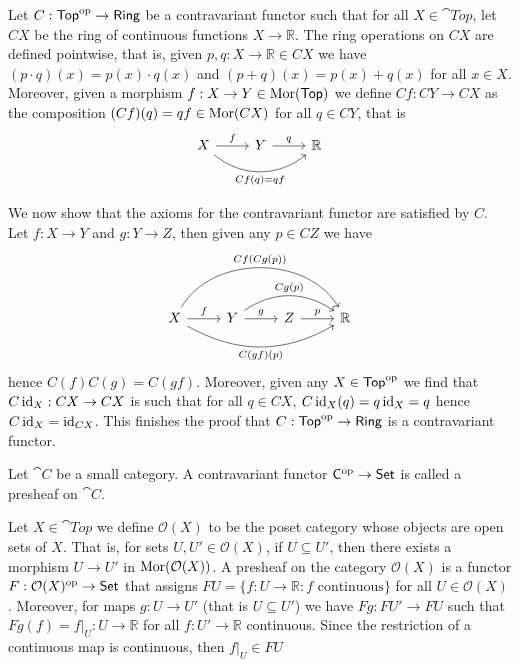 \begin{example}
  Let \(C: \mathsf{Top}^{\mathrm{op}} \to \mathsf{Ring}\) be a contravariant functor such that
  for all \(X \in \cat{Top}\), let \(C X\) be the ring of continuous functions
  \(X \to \mathbb{R}\). The ring operations on \(C X\) are defined pointwise,
  that is, given \(p, q: X \to \mathbb{R} \in C X\) we have \((p \cdot q) (x) =
  p(x) \cdot q(x)\) and \((p + q)(x) = p(x) + q(x)\) for all \(x \in X\).
  Moreover, given a morphism \(f: X \to Y \in \operatorname{Mor}(\mathsf{Top})\) we define \(C f:
  C Y \to C X\) as the composition \((C f)(q) = q f \in \operatorname{Mor}(C X)\) for all \(q
  \in C Y\), that is
  \[
    \begin{tikzcd}
      X \ar[r, "f"] \ar[rr, bend right = 40, swap, "C f(q) = q f"]
      & Y \ar[r, "q"] & \mathbb{R}
    \end{tikzcd}
  \] 

  We now show that the axioms for the contravariant functor are satisfied by
  \(C\). Let \(f: X \to Y\) and \(g: Y \to Z\), then given any \(p \in C Z\) we
  have 
  \[
    \begin{tikzcd}
      X \ar[r, "f"] 
      \ar[rrr, bend left = 60, "C f(C g (p))"]
      \ar[rrr, bend right, swap, "C (g f)(p)"]
      & Y \ar[r, "g"]
      \ar[rr, bend left = 35, "C g(p)"]
      & Z \ar[r, "p"] & \mathbb{R}
    \end{tikzcd}
  \] 
  hence \(C (f) C (g) = C (g f)\). Moreover, given any \(X \in \mathsf{Top}^{\mathrm{op}}\) 
  we find that \(C \operatorname{id}_X: C X \to C X\) is such that for all \(q \in C X\), \(C
  \operatorname{id}_X (q) = q \operatorname{id}_X = q\) hence \(C \operatorname{id}_X = \operatorname{id}_{C X}\). This finishes the
  proof that \(C: \mathsf{Top}^{\mathrm{op}} \to \mathsf{Ring}\) is a contravariant functor.
\end{example}

\begin{definition}[Presheaf]\label{def: presheaf}
  Let \(\cat C\) be a small category. A contravariant functor \(\mathsf C^{\mathrm{op}} \to
  \mathsf{Set}\) is called a presheaf on \(\cat C\).
\end{definition}

\begin{example}
  Let \(X \in \cat{Top}\) we define \(\mathcal O(X)\) to be the poset category
  whose objects are open sets of \(X\). That is, for sets \(U, U' \in \mathcal
  O(X)\), if \(U \subseteq U'\), then there exists a morphism \(U \to U'\) in
  \(\operatorname{Mor}(\mathcal O(X))\). A presheaf on the category \(\mathcal O(X)\) is a
  functor \(F: \mathcal O(X)^{\mathrm{op}} \to \mathsf{Set}\) that assigns \(F U = \{f: U \to
  \mathbb{R}: f \text{ continuous}\}\) for all \(U \in \mathcal O(X)\).
  Moreover, for maps \(g: U \to U'\) (that is \(U \subseteq U'\)) we have \(F g:
  F U' \to F U\) such that \(F g(f) = f|_U: U \to \mathbb{R}\) for all \(f: U'
  \to \mathbb{R}\) continuous. Since the restriction of a continuous map is
  continuous, then \(f|_U \in F U\)
\end{example}

